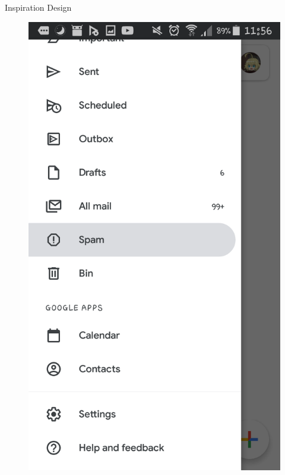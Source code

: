 \documentclass[aspectratio=169]{beamer}
\begin{document}
\begin{frame}[plain]{Inspiration Design}
\begin{varwidth}{.3\textwidth}\pause
        \begin{figure}
            \centering
            \includegraphics[height=.8\textheight]{media/gmail-screenshot.png}\\

\end{figure}
\end{varwidth}
\end{frame}
\end{document}
